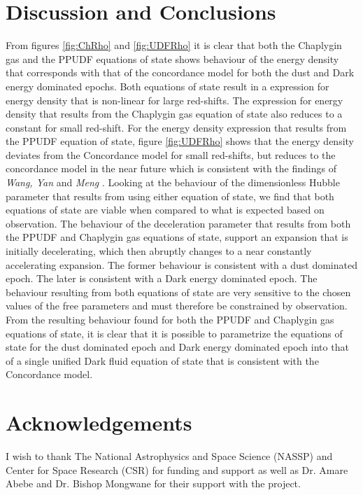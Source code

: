 \documentclass[a4paper, 11pt]{FSKH_623_Report}
\numberwithin{equation}{section}
\begin{document}
\section{Discussion and Conclusions}
From figures \ref{fig:ChRho} and \ref{fig:UDFRho} it is clear that both the Chaplygin gas and the PPUDF equations of state shows behaviour of the energy density that corresponds with that of the concordance model for both the dust and Dark energy dominated epochs. Both equations of state result in a expression for energy density that is non-linear for large red-shifts. The expression for energy density that results from the Chaplygin gas equation of state also reduces to a constant for small red-shift. For the energy density expression that results from the PPUDF equation of state, figure \ref{fig:UDFRho} shows that the energy density deviates from the Concordance model for small red-shifts, but reduces to the concordance model in the near future which is consistent with the findings of \textit{Wang, Yan} and \textit{Meng} \citep{wang2017new}. Looking at the behaviour of the dimensionless Hubble parameter that results from using either equation of state, we find that both equations of state are viable when compared to what is expected based on observation. The behaviour of the deceleration parameter that results from both the PPUDF and Chaplygin gas equations of state, support an expansion that is initially decelerating, which then abruptly changes to a near constantly accelerating expansion. The former behaviour is consistent with a dust dominated epoch. The later is consistent with a Dark energy dominated epoch. The behaviour resulting from both equations of state are very sensitive to the chosen values of the free parameters and must therefore be constrained by observation.\\
From the resulting behaviour found for both the PPUDF and Chaplygin gas equations of state, it is clear that it is possible to parametrize the equations of state for the dust dominated epoch and Dark energy dominated epoch into that of a single unified Dark fluid equation of state that is consistent with the Concordance model.

\section{Acknowledgements}
I wish to thank The National Astrophysics and Space Science (NASSP) and  Center for Space Research (CSR) for funding and support as well as Dr. Amare Abebe  and Dr. Bishop Mongwane for their support with the project.
\end{document}
